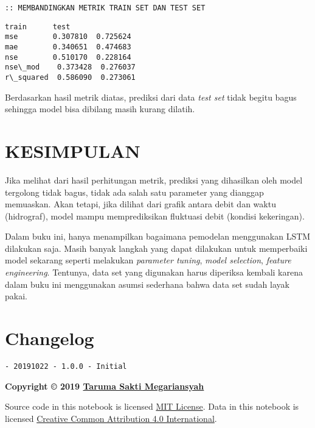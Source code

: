 \documentclass[11pt]{article}
\makeatletter
\newcommand{\boxspacing}{\kern\kvtcb@left@rule\kern\kvtcb@boxsep}
\newcommand{\prompt}[4]{
        \ttfamily\llap{{\color{#2}[#3]:\hspace{3pt}#4}}\vspace{-\baselineskip}
    }
\makeatother
\begin{document}
    \begin{Verbatim}[commandchars=\\\{\}]
:: MEMBANDINGKAN METRIK TRAIN SET DAN TEST SET
    \end{Verbatim}

            \begin{tcolorbox}[breakable, size=fbox, boxrule=.5pt, pad at break*=1mm, opacityfill=0]
\prompt{Out}{outcolor}{0}{\boxspacing}
\begin{Verbatim}[commandchars=\\\{\}]
              train      test
mse        0.307810  0.725624
mae        0.340651  0.474683
nse        0.510170  0.228164
nse\_mod    0.373428  0.276037
r\_squared  0.586090  0.273061
\end{Verbatim}
\end{tcolorbox}
        
    Berdasarkan hasil metrik diatas, prediksi dari data \emph{test set}
tidak begitu bagus sehingga model bisa dibilang masih kurang dilatih.

    \hypertarget{kesimpulan}{%
\section{KESIMPULAN}\label{kesimpulan}}

    Jika melihat dari hasil perhitungan metrik, prediksi yang dihasilkan
oleh model tergolong tidak bagus, tidak ada salah satu parameter yang
dianggap memuaskan. Akan tetapi, jika dilihat dari grafik antara debit
dan waktu (hidrograf), model mampu memprediksikan fluktuasi debit
(kondisi kekeringan).

Dalam buku ini, hanya menampilkan bagaimana pemodelan menggunakan LSTM
dilakukan saja. Masih banyak langkah yang dapat dilakukan untuk
memperbaiki model sekarang seperti melakukan \emph{parameter tuning},
\emph{model selection}, \emph{feature engineering}. Tentunya, data set
yang digunakan harus diperiksa kembali karena dalam buku ini menggunakan
asumsi sederhana bahwa data set sudah layak pakai.

    \hypertarget{changelog}{%
\section{Changelog}\label{changelog}}

\begin{verbatim}
- 20191022 - 1.0.0 - Initial
\end{verbatim}

\textbf{Copyright © 2019 \href{https://taruma.github.io}{Taruma Sakti
Megariansyah}}

Source code in this notebook is licensed
\href{https://github.com/taruma/vivaldi/blob/master/LICENSE}{MIT
License}. Data in this notebook is licensed
\href{https://creativecommons.org/licenses/by/4.0/}{Creative Common
Attribution 4.0 International}.


    
    
    
\end{document}
